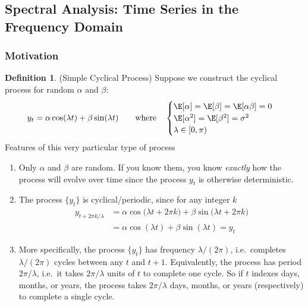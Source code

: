 \documentclass[12pt]{article}
\theoremstyle{plain}
\theoremstyle{definition}
\newtheorem{defn}[thm]{Definition}
\theoremstyle{remark}
\begin{document}
\clearpage
\subsection{Spectral Analysis: Time Series in the Frequency Domain}


\subsubsection{Motivation}


\begin{defn}(Simple Cyclical Process)
Suppose we construct the cyclical process
for random $\alpha$ and $\beta$:
\begin{align*}
  y_t = \alpha \cos(\lambda t) + \beta \sin(\lambda t)
  \qquad
  \text{where}\quad
  \begin{cases}
    \E[\alpha] = \E[\beta] = \E[\alpha \beta] = 0
    \\
    \E[\alpha^2] = \E[\beta^2] = \sigma^2
    \\
    \lambda \in [0,\pi)
  \end{cases}
\end{align*}
Features of this very particular type of process
\begin{enumerate}[label=(\roman*)]
  \item Only $\alpha$ and $\beta$ are random. If you know them, you know
    \emph{exactly} how the process will evolve over time since the
    process $y_t$ is otherwise deterministic.
  \item The process $\{y_t\}$ is cyclical/periodic, since for any
    integer $k$
    \begin{align*}
      y_{t+2\pi k/\lambda}
      &= \alpha \cos\big(\lambda t+2\pi k\big)
      +\beta \sin\big(\lambda t +2\pi k\big)
      \\
      &= \alpha \cos(\lambda t)
      +\beta \sin(\lambda t)
      = y_t
    \end{align*}

  \item
    More specifically, the process $\{y_t\}$ has frequency
    $\lambda/(2\pi)$, i.e.\ completes $\lambda/(2\pi)$ cycles between
    any $t$ and $t+1$.  Equivalently, the process has period
    $2\pi/\lambda$, i.e.\ it takes $2\pi/\lambda$ units of $t$ to
    complete one cycle. So if $t$ indexes days, months, or years, the
    process takes $2\pi/\lambda$ days, months, or years (respectively)
    to complete a single cycle.


\end{enumerate}
\end{defn}
\end{document}
